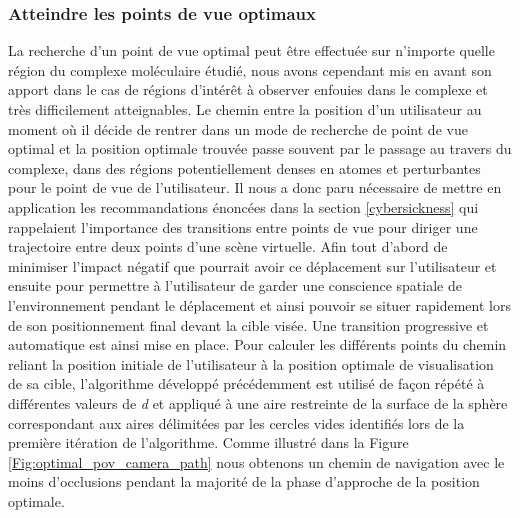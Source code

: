 \subsubsection{Atteindre les points de vue optimaux}

La recherche d'un point de vue optimal peut être effectuée sur n'importe quelle région du complexe moléculaire étudié, nous avons cependant mis en avant son apport dans le cas de régions d'intérêt à observer enfouies dans le complexe et très difficilement atteignables. Le chemin entre la position d'un utilisateur au moment où il décide de rentrer dans un mode de recherche de point de vue optimal et la position optimale trouvée passe souvent par le passage au travers du complexe, dans des régions potentiellement denses en atomes et perturbantes pour le point de vue de l'utilisateur. Il nous a donc paru nécessaire de mettre en application les recommandations énoncées dans la section \ref{cybersickness} qui rappelaient l'importance des transitions entre points de vue pour diriger une trajectoire entre deux points d'une scène virtuelle. Afin tout d'abord de minimiser l'impact négatif que pourrait avoir ce déplacement sur l'utilisateur et ensuite pour permettre à l'utilisateur de garder une conscience spatiale de l'environnement pendant le déplacement et ainsi pouvoir se situer rapidement lors de son positionnement final devant la cible visée.
Une transition progressive et automatique est ainsi mise en place. Pour calculer les différents points du chemin reliant la position initiale de l'utilisateur à la position optimale de visualisation de sa cible, l'algorithme développé précédemment est utilisé de façon répété à différentes valeurs de \textit{d} et appliqué à une aire restreinte de la surface de la sphère correspondant aux aires délimitées par les cercles vides identifiés lors de la première itération de l'algorithme. Comme illustré dans la Figure \ref{Fig:optimal_pov_camera_path} nous obtenons un chemin de navigation avec le moins d'occlusions pendant la majorité de la phase d'approche de la position optimale.

